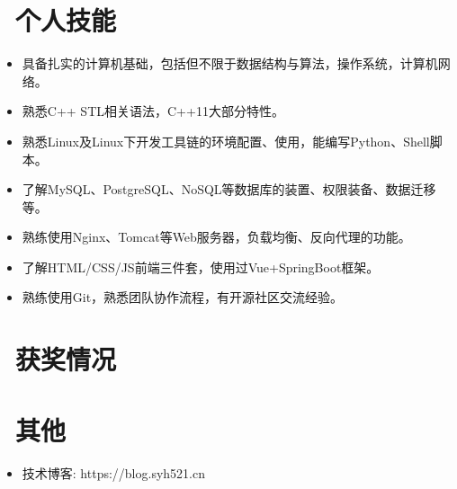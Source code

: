 \documentclass{resume}
\begin{document}

\section{\faCogs\ 个人技能}
\begin{itemize}[parsep=0.5ex]
  \item 具备扎实的计算机基础，包括但不限于数据结构与算法，操作系统，计算机网络。
  \item 熟悉C++ STL相关语法，C++11大部分特性。
  \item 熟悉Linux及Linux下开发工具链的环境配置、使用，能编写Python、Shell脚本。
  \item 了解MySQL、PostgreSQL、NoSQL等数据库的装置、权限装备、数据迁移等。
  \item 熟练使用Nginx、Tomcat等Web服务器，负载均衡、反向代理的功能。
  \item 了解HTML/CSS/JS前端三件套，使用过Vue+SpringBoot框架。
  \item 熟练使用Git，熟悉团队协作流程，有开源社区交流经验。
\end{itemize}

\section{\faHeartO\ 获奖情况}

\section{\faInfo\ 其他}
\begin{itemize}[parsep=0.5ex]
  \item 技术博客: https://blog.syh521.cn
\end{itemize}

%
%
\end{document}
